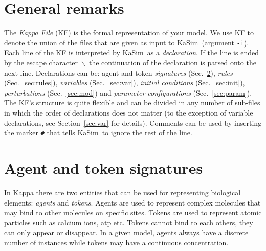 \documentclass[11pt]{book}
\def\KaSim{\textsf{KaSim}}
\def\ttt#1{\texttt{#1}}
\def\bs{\backslash}
\def\imp#1{\emph{#1}\index{#1}}
\begin{document}
\section{General remarks}
The \emph{Kappa File} (KF) is the formal representation of your model. We use KF to denote the union of the files that are given as input to \KaSim~(argument \ttt{-i}). Each line of the KF is interpreted by \KaSim~as a \emph{declaration}. If the line is ended by the escape character~\textquotesingle \ttt{$\bs$}\textquotesingle ~the continuation of the declaration is parsed onto the next line. Declarations can be: agent and token \emph{signatures} (Sec.~\ref{sec:sig}), \emph{rules} (Sec.~\ref{sec:rules}), \emph{variables} (Sec.~\ref{sec:var}), \emph{initial conditions} (Sec.~\ref{sec:init}), \emph{perturbations} (Sec.~\ref{sec:mod}) and \emph{parameter configurations} (Sec.~\ref{sec:param}). The KF's structure is quite flexible and can be divided in any number of sub-files in which the order of declarations does not matter (to the exception of variable declarations, see Section~\ref{sec:var} for details). Comments can be used by inserting the marker \ttt{\#} that tells \KaSim~to ignore the rest of the line. 

\section{Agent and token signatures}\label{sec:sig}
%
In Kappa there are two entities that can be used for representing biological elements: \imp{agents} and \imp{tokens}.  Agents are used to represent complex molecules that may bind to other molecules on specific sites. Tokens are used to represent atomic particles such as calcium ions, atp etc. Tokens cannot bind to each others, they can only appear or disappear. In a given model, agents always have a discrete number of instances while tokens may have a continuous concentration.
\end{document}
